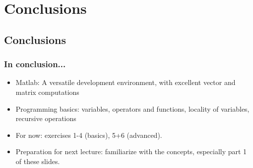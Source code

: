 \documentclass[11pt,table,final,fleqn,xcolor={usenames,dvipsnames},unknownkeysallowed,handout]{beamer}
\begin{document}
\section{Conclusions}
\subsection*{Conclusions}
\begin{frame}[fragile]
  \frametitle{In conclusion...}
  \begin{itemize}
     \item Matlab: A versatile development environment, with excellent vector and matrix computations
     \item Programming basics: variables, operators and functions, locality of variables, recursive operations
  \end{itemize}
  \pause
    \begin{itemize}
     \item For now: exercises 1-4 (basics), 5+6 (advanced).
     \item Preparation for next lecture: familiarize with the concepts, especially part 1 of these slides.
  \end{itemize}
  \pause
\end{frame}
\end{document}
